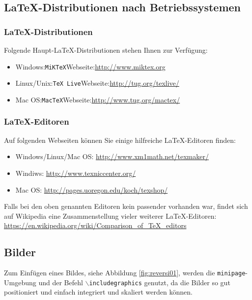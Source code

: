 \documentclass[12pt,a4paper,bibliography=totocnumbered,listof=totocnumbered]{scrartcl}
\begin{document}
\subsection{\LaTeX-Distributionen nach Betriebssystemen}

\subsubsection{\LaTeX-Distributionen}
Folgende Haupt-\LaTeX-Distributionen stehen Ihnen zur Verfügung:
\begin{itemize}
  \item Windows:\quad \texttt{MiKTeX}\quad Webseite:\quad\url{http://www.miktex.org}
  \item Linux/Unix:\quad \texttt{TeX Live}\quad Webseite:\quad\url{http://tug.org/texlive/}
  \item Mac OS:\quad \texttt{MacTeX}\quad Webseite:\quad\url{http://www.tug.org/mactex/}
\end{itemize}

\subsubsection{\LaTeX-Editoren}
Auf folgenden Webseiten können Sie einige hilfreiche \LaTeX-Editoren finden:
\begin{itemize}
  \item Windows/Linux/Mac OS: \url{http://www.xm1math.net/texmaker/}
  \item Windiws: \url{http://www.texniccenter.org/}
  \item Mac OS: \url{http://pages.uoregon.edu/koch/texshop/}
\end{itemize}

Falls bei den oben genannten Editoren kein passender vorhanden war, findet sich auf Wikipedia eine Zusammenstellung vieler weiterer \LaTeX-Editoren:\\[1em]
\hspace*{3cm}\url{https://en.wikipedia.org/wiki/Comparison_of_TeX_editors}


\subsection{Bilder}
Zum Einfügen eines Bildes, siehe Abbildung \ref{fig:reversi01}, werden die \texttt{minipage}-Umgebung und der Befehl \texttt{$\backslash$includegraphics} genutzt, da die Bilder so gut positioniert und einfach integriert und skaliert werden können.
\end{document}
